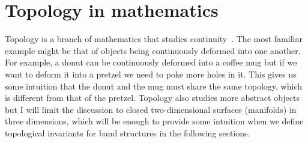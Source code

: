 \section{Topology in mathematics} 

Topology is a branch of mathematics that studies continuity~\cite{differential_topology_and_geometry}. The most familiar example might be that of objects being continuously deformed into one another. For example, a donut can be continuously deformed into a coffee mug but if we want to deform it into a pretzel we need to poke more holes in it. This gives us some intuition that the donut and the mug must share the same topology, which is different from that of the pretzel. Topology also studies more abstract objects but I will limit the discussion to closed two-dimensional surfaces (manifolds) in three dimensions, which will be enough to provide some intuition when we define topological invariants for band structures in the following sections.  


